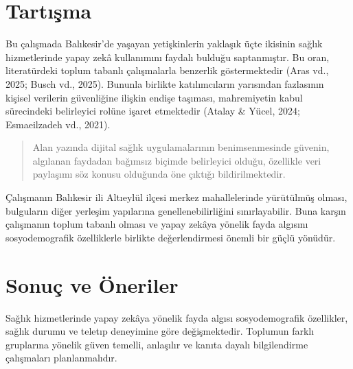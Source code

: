 \section{Tartışma}

Bu çalışmada Balıkesir'de yaşayan yetişkinlerin yaklaşık üçte ikisinin sağlık
hizmetlerinde yapay zekâ kullanımını faydalı bulduğu saptanmıştır. Bu oran,
literatürdeki toplum tabanlı çalışmalarla benzerlik göstermektedir
(Aras vd., 2025; Busch vd., 2025). Bununla birlikte katılımcıların yarısından
fazlasının kişisel verilerin güvenliğine ilişkin endişe taşıması, mahremiyetin
kabul sürecindeki belirleyici rolüne işaret etmektedir
(Atalay \& Yücel, 2024; Esmaeilzadeh vd., 2021).

\begin{quote}
Alan yazında dijital sağlık uygulamalarının benimsenmesinde güvenin, algılanan
faydadan bağımsız biçimde belirleyici olduğu, özellikle veri paylaşımı söz
konusu olduğunda öne çıktığı bildirilmektedir.
\end{quote}

Çalışmanın Balıkesir ili Altıeylül ilçesi merkez mahallelerinde yürütülmüş
olması, bulguların diğer yerleşim yapılarına genellenebilirliğini
sınırlayabilir. Buna karşın çalışmanın toplum tabanlı olması ve yapay zekâya
yönelik fayda algısını sosyodemografik özelliklerle birlikte değerlendirmesi
önemli bir güçlü yönüdür.

\section{Sonuç ve Öneriler}

Sağlık hizmetlerinde yapay zekâya yönelik fayda algısı sosyodemografik
özellikler, sağlık durumu ve teletıp deneyimine göre değişmektedir. Toplumun
farklı gruplarına yönelik güven temelli, anlaşılır ve kanıta dayalı
bilgilendirme çalışmaları planlanmalıdır.
